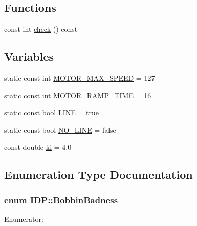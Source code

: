 \subsection*{Functions}
\begin{DoxyCompactItemize}
\item 
const int \hyperlink{namespaceIDP_a3300f0a24143e1251336837f84151aaa}{check} () const 
\end{DoxyCompactItemize}
\subsection*{Variables}
\begin{DoxyCompactItemize}
\item 
static const int \hyperlink{namespaceIDP_a4ead0b21ad2c507b542445695182d4cd}{MOTOR\_\-MAX\_\-SPEED} = 127
\item 
static const int \hyperlink{namespaceIDP_ab3a00a6cc8a6dba271e38d337daf4703}{MOTOR\_\-RAMP\_\-TIME} = 16
\item 
static const bool \hyperlink{namespaceIDP_a559427fa7c37f2edc0a43a4b793c4fdc}{LINE} = true
\item 
static const bool \hyperlink{namespaceIDP_a5ea027b77276a637783f68955303b9b8}{NO\_\-LINE} = false
\item 
const double \hyperlink{namespaceIDP_aa2b933f600179026dbca5d8bc63c3baf}{ki} = 4.0
\end{DoxyCompactItemize}


\subsection{Enumeration Type Documentation}
\hypertarget{namespaceIDP_adf12b2c1e1c228810b18c34a3c88c32d}{
\subsubsection[{BobbinBadness}]{\setlength{\rightskip}{0pt plus 5cm}enum {\bf IDP::BobbinBadness}}}
\label{namespaceIDP_adf12b2c1e1c228810b18c34a3c88c32d}
\begin{Desc}
\item[Enumerator: ]\par
\begin{description}
\item[{\em 
\hypertarget{namespaceIDP_adf12b2c1e1c228810b18c34a3c88c32dafdc1b8b5a9d849fd99ac2ae438b632dd}{
BOBBIN\_\-GOOD}
\label{namespaceIDP_adf12b2c1e1c228810b18c34a3c88c32dafdc1b8b5a9d849fd99ac2ae438b632dd}
}]\item[{\em 
\hypertarget{namespaceIDP_adf12b2c1e1c228810b18c34a3c88c32da6cb4993a316e9d4dc9836d3d990fd0f6}{
BOBBIN\_\-BAD}
\label{namespaceIDP_adf12b2c1e1c228810b18c34a3c88c32da6cb4993a316e9d4dc9836d3d990fd0f6}
}]\end{description}
\end{Desc}

